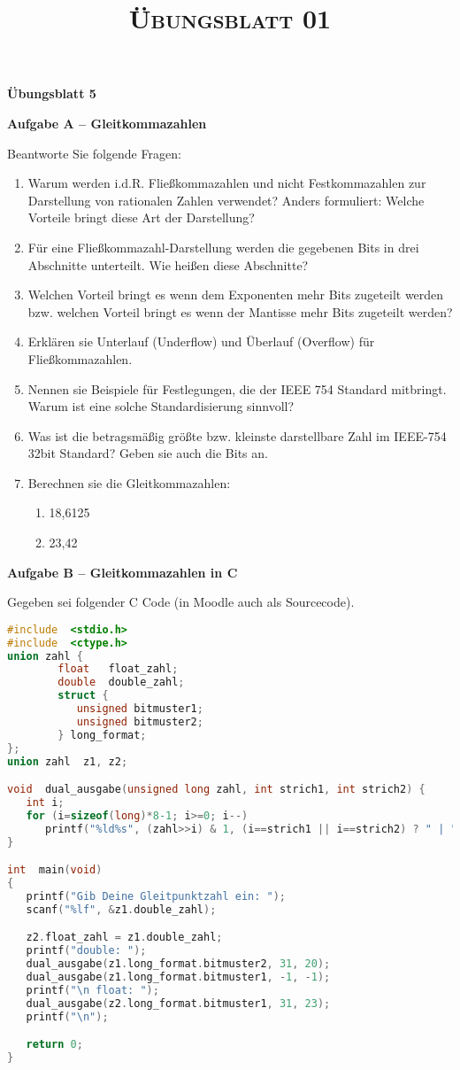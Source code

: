 \documentclass[paper=a4,fontsize=11pt]{scrartcl}%
\title{	
\normalfont \normalsize 
\textsc{Übungsblatt 01}
}
\numberwithin{equation}{section}
\begin{document}
\vspace*{-1cm}
\begin{center}
\Large{\textbf{Übungsblatt 5}}
\end{center}

\begin{center}\Large{\textbf{Aufgabe A -- Gleitkommazahlen}}\end{center}
Beantworte Sie folgende Fragen:
\begin{enumerate}
	\item Warum werden i.d.R. Fließkommazahlen und nicht Festkommazahlen zur Darstellung von rationalen Zahlen verwendet? Anders formuliert: Welche Vorteile bringt diese Art der Darstellung?
	\item Für eine Fließkommazahl-Darstellung werden die gegebenen Bits in drei Abschnitte unterteilt. Wie heißen diese Abschnitte?
	\item Welchen Vorteil bringt es wenn dem Exponenten mehr Bits zugeteilt werden bzw. welchen Vorteil bringt es wenn der Mantisse mehr Bits zugeteilt werden?
	\item Erklären sie Unterlauf (Underflow) und Überlauf (Overflow) für Fließkommazahlen.
	\item Nennen sie Beispiele für Festlegungen, die der IEEE 754 Standard mitbringt. Warum ist eine solche Standardisierung sinnvoll?
	\item Was ist die betragsmäßig größte bzw. kleinste darstellbare Zahl im IEEE-754 32bit Standard? Geben sie auch die Bits an.
	\item Berechnen sie die Gleitkommazahlen:
	\begin{enumerate}
		\item 18,6125
		\item 23,42
	\end{enumerate}
\end{enumerate}

\begin{center}\Large{\textbf{Aufgabe B -- Gleitkommazahlen in C}}\end{center}
Gegeben sei folgender C Code (in Moodle auch als Sourcecode).
\begin{lstlisting}[language=C]
#include  <stdio.h>
#include  <ctype.h>
union zahl {
        float   float_zahl;
        double  double_zahl;
        struct {
           unsigned bitmuster1;
           unsigned bitmuster2;
        } long_format;
};
union zahl  z1, z2;

void  dual_ausgabe(unsigned long zahl, int strich1, int strich2) {
   int i;
   for (i=sizeof(long)*8-1; i>=0; i--)
      printf("%ld%s", (zahl>>i) & 1, (i==strich1 || i==strich2) ? " | " : "");
}

int  main(void)
{
   printf("Gib Deine Gleitpunktzahl ein: ");
   scanf("%lf", &z1.double_zahl);

   z2.float_zahl = z1.double_zahl;
   printf("double: ");
   dual_ausgabe(z1.long_format.bitmuster2, 31, 20);
   dual_ausgabe(z1.long_format.bitmuster1, -1, -1);
   printf("\n float: ");
   dual_ausgabe(z2.long_format.bitmuster1, 31, 23);
   printf("\n");

   return 0;
}
\end{lstlisting}
\end{document}
